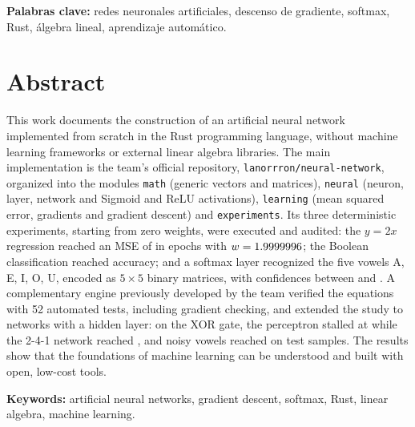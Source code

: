 \medskip\noindent\textbf{Palabras clave:} redes neuronales artificiales, descenso de gradiente, softmax, Rust, álgebra lineal, aprendizaje automático.

\chapter*{Abstract}
This work documents the construction of an artificial neural network implemented from scratch in the Rust programming language, without machine learning frameworks or external linear algebra libraries. The main implementation is the team's official repository, \texttt{lanorrron/neural-network}, organized into the modules \texttt{math} (generic vectors and matrices), \texttt{neural} (neuron, layer, network and Sigmoid and ReLU activations), \texttt{learning} (mean squared error, gradients and gradient descent) and \texttt{experiments}. Its three deterministic experiments, starting from zero weights, were executed and audited: the $y = 2x$ regression reached an MSE of \OfLinMseFin{} in \OfLinEpocas{} epochs with $w=1.9999996$; the Boolean classification reached \OfBoolAcc{} accuracy; and a softmax layer recognized the five vowels A, E, I, O, U, encoded as $5\times5$ binary matrices, with confidences between \OfVocConfMin{} and \OfVocConfMax. A complementary engine previously developed by the team verified the equations with 52 automated tests, including gradient checking, and extended the study to networks with a hidden layer: on the XOR gate, the perceptron stalled at \EdosAccPer{} while the 2-4-1 network reached \EdosAccMul{}, and noisy vowels reached \EtresAccPru{} on \EtresNPru{} test samples. The results show that the foundations of machine learning can be understood and built with open, low-cost tools.

\medskip\noindent\textbf{Keywords:} artificial neural networks, gradient descent, softmax, Rust, linear algebra, machine learning.

\clearpage
{\singlespacing
\renewcommand{\contentsname}{Índice General}
\tableofcontents
\renewcommand{\listfigurename}{Índice de Figuras}
\clearpage{}
\listoffigures
\renewcommand{\listtablename}{Índice de Tablas}
\bigskip{}
{\let\clearpage\relax\listoftables}
\bigskip{}
{\let\clearpage\relax\lstlistoflistings}
}

